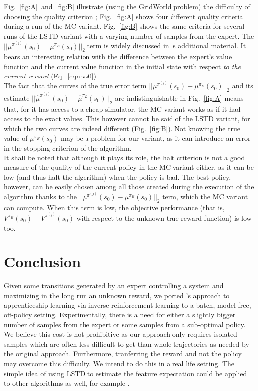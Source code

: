 \documentclass{jfpda2011}
\begin{document}
Fig.~\ref{fig:A}~and~\ref{fig:B} illustrate (using the GridWorld problem) the difficulty of choosing the quality criterion ; Fig.~\ref{fig:A} shows four different quality criteria during a run of the MC variant. Fig.~\ref{fig:B} shows the same criteria for several runs of the LSTD variant with a varying number of samples from the expert. The $||\mu^{\pi^{(j)}}(s_0) - \mu^{\pi_E}(s_0)||_2$ term is widely discussed in \citep{abbeel2004apprenticeship}'s additional material. It bears an interesting relation with the difference between the expert's value function and the current value function in the initial state with respect \emph{to the current reward} (Eq.~\ref{eqn:vs0}).\\

The fact that  the curves of the true error term $||\mu^{\pi^{(j)}}(s_0) - \mu^{\pi_E}(s_0)||_2$ and  its estimate $||\hat\mu^{\pi^{(j)}}(s_0) - \hat\mu^{\pi_E}(s_0)||_2$ are indistinguishable in Fig.~\ref{fig:A} means that, for it has access to a cheap simulator, the MC variant works as if it had access to the exact values. This however cannot be said of the LSTD variant, for which the two curves are indeed different (Fig.~\ref{fig:B}). Not knowing the true value of $\mu^{\pi_E}(s_0)$ may be a problem for our variant, as it can introduce an error in the stopping criterion of the algorithm.\\

It shall be noted that although it plays its role, the halt criterion is not a good measure of the quality of the current policy in the MC variant either, as it can be low (and thus halt the algorithm) when the policy is bad. The best policy, however, can be easily chosen among all those created during the execution of the algorithm thanks to the $||\mu^{\pi^{(j)}}(s_0) - \mu^{\pi_E}(s_0)||_2$ term, which the MC variant can compute. When this term is low, the objective performance (that is, $V^{\pi_E}(s_0)-V^{\pi^{(j)}}(s_0)$ with respect to the unknown true reward function) is low too. 
\section{Conclusion}
\label{sec:conclusion}
Given some transitions generated by an expert controlling a system and maximizing in the long run an unknown reward, we ported \citet{abbeel2004apprenticeship}'s approach to apprenticeship learning via inverse reinforcement learning to a batch, model-free, off-policy setting. Experimentally, there is a need for either a slightly bigger number of samples from the expert or some samples from a sub-optimal policy. We believe this cost is not prohibitive as our approach only requires isolated samples which are often less difficult to get than whole trajectories as needed by the original approach. Furthermore, tranferring the reward and not the policy may overcome this difficulty. We intend to do this in a real life setting.
The simple idea of using LSTD to estimate the feature expectation could be applied to other algorithms as well, for example \citep{abbeel2004apprenticeship,syed2008apprenticeship,syed2008game,ziebart2008maximum}.\\

%
%

\end{document}
